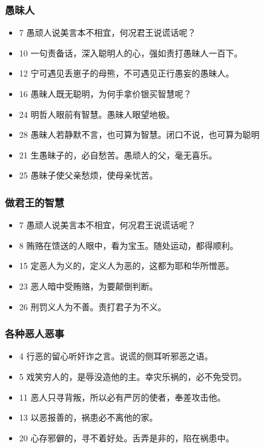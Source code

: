 \subsubsection{愚昧人}
\begin{itemize}
\itemsep-.45em 
\item 7 愚顽人说美言本不相宜，何况君王说谎话呢？
\item 10 一句责备话，深入聪明人的心，强如责打愚昧人一百下。
\item 12 宁可遇见丢崽子的母熊，不可遇见正行愚妄的愚昧人。
\item 16 愚昧人既无聪明，为何手拿价银买智慧呢？
\item 24 明哲人眼前有智慧。愚昧人眼望地极。
\item 28 愚昧人若静默不言，也可算为智慧。闭口不说，也可算为聪明
\item 21 生愚昧子的，必自愁苦。愚顽人的父，毫无喜乐。
\item 25 愚昧子使父亲愁烦，使母亲忧苦。
\end{itemize}

\subsubsection{做君王的智慧}
\begin{itemize}
\itemsep-.45em 
\item 7 愚顽人说美言本不相宜，何况君王说谎话呢？
\item 8 贿赂在馈送的人眼中，看为宝玉。随处运动，都得顺利。
\item 15 定恶人为义的，定义人为恶的，这都为耶和华所憎恶。
\item 23 恶人暗中受贿赂，为要颠倒判断。
\item 26 刑罚义人为不善。责打君子为不义。
\end{itemize}

\subsubsection{各种恶人恶事}
\begin{itemize}
\itemsep-.45em 
\item 4 行恶的留心听奸诈之言。说谎的侧耳听邪恶之语。
\item 5 戏笑穷人的，是辱没造他的主。幸灾乐祸的，必不免受罚。
\item 11 恶人只寻背叛，所以必有严厉的使者，奉差攻击他。
\item 13 以恶报善的，祸患必不离他的家。
\item 20 心存邪僻的，寻不着好处。舌弄是非的，陷在祸患中。
\end{itemize}


